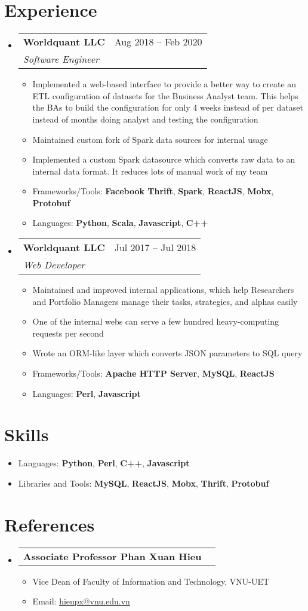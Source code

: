 \documentclass[a4paper,11pt]{article}
\makeatletter
\newcommand{\resumeItem}[1]{
  \item\small{
    {#1 \vspace{-2pt}}
  }
}
\newcommand{\resumeSubheadTwo}[2]{
  \vspace{-1pt}\item
    \begin{tabular*}{0.97\textwidth}{l@{\extracolsep{\fill}}r}
      \textbf{#1} & #2
    \end{tabular*}\vspace{-5pt}
}
\newcommand{\resumeSubhead}[3]{
  \vspace{-1pt}\item
    \begin{tabular*}{0.97\textwidth}{l@{\extracolsep{\fill}}r}
      \textbf{#1} & #2 \\
      \textit{\normalsize#3}
    \end{tabular*}\vspace{-5pt}
}
\newcommand{\resumeSubHeadingListStart}{\begin{itemize}[leftmargin=*]}
\newcommand{\resumeSubHeadingListEnd}{\end{itemize}}
\newcommand{\resumeItemListStart}{\begin{itemize}}
\newcommand{\resumeItemListEnd}{\end{itemize}\vspace{-5pt}}
\makeatother
\begin{document}
\section{Experience}
  \resumeSubHeadingListStart
    \resumeSubhead
      {Worldquant LLC}{Aug 2018 – Feb 2020}
      {Software Engineer}
      \resumeItemListStart
        \resumeItem{Implemented a web-based interface to provide a better way to create an ETL configuration of datasets for the Business Analyst team. This helps the BAs to build the configuration for only 4 weeks instead of per dataset instead of months doing analyst and testing the configuration}
        \resumeItem{Maintained custom fork of Spark data sources for internal usage}
        \resumeItem{Implemented a custom Spark datasource which converts raw data to an internal data format. It reduces lots of manual work of my team}
        \resumeItem{Frameworks/Tools: \textbf{Facebook Thrift}, \textbf{Spark}, \textbf{ReactJS}, \textbf{Mobx}, \textbf{Protobuf}}
        \resumeItem{Languages: \textbf{Python}, \textbf{Scala}, \textbf{Javascript}, \textbf{C++}}
      \resumeItemListEnd

    \resumeSubhead
      {Worldquant LLC}{Jul 2017 – Jul 2018}
      {Web Developer}
      \resumeItemListStart
        \resumeItem{Maintained and improved internal applications, which help Researchers and Portfolio Managers manage their tasks, strategies, and alphas easily}
        \resumeItem{One of the internal webs can serve a few hundred heavy-computing requests per second}
        \resumeItem{Wrote an ORM-like layer which converts JSON parameters to SQL query}
        \resumeItem{Frameworks/Tools: \textbf{Apache HTTP Server}, \textbf{MySQL}, \textbf{ReactJS}}
        \resumeItem{Languages: \textbf{Perl}, \textbf{Javascript}}
      \resumeItemListEnd
  \resumeSubHeadingListEnd

\section{Skills}
  \resumeItemListStart
    \resumeItem{Languages: \textbf{Python}, \textbf{Perl}, \textbf{C++}, \textbf{Javascript}}
    \resumeItem{Libraries and Tools: \textbf{MySQL}, \textbf{ReactJS}, \textbf{Mobx}, \textbf{Thrift}, \textbf{Protobuf}}
  \resumeItemListEnd

\section{References}
  \resumeSubHeadingListStart
    \resumeSubheadTwo
      {Associate Professor Phan Xuan Hieu}{}
      \resumeItemListStart
        \resumeItem{Vice Dean of Faculty of Information and Technology, VNU-UET}
        \resumeItem{Email: \href{mailto:hieupx@vnu.edu.vn}{hieupx@vnu.edu.vn}}
      \resumeItemListEnd
  \resumeSubHeadingListEnd
\end{document}
